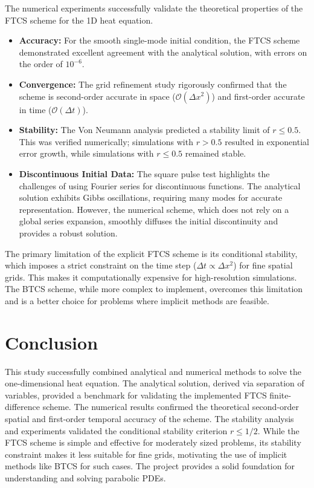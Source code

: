 \documentclass[11pt, a4paper]{article}
\begin{document}
The numerical experiments successfully validate the theoretical properties of the FTCS scheme for the 1D heat equation.
\begin{itemize}
    \item \textbf{Accuracy:} For the smooth single-mode initial condition, the FTCS scheme demonstrated excellent agreement with the analytical solution, with errors on the order of $10^{-6}$.
    \item \textbf{Convergence:} The grid refinement study rigorously confirmed that the scheme is second-order accurate in space ($\mathcal{O}(\Delta x^2)$) and first-order accurate in time ($\mathcal{O}(\Delta t)$).
    \item \textbf{Stability:} The Von Neumann analysis predicted a stability limit of $r \leq 0.5$. This was verified numerically; simulations with $r > 0.5$ resulted in exponential error growth, while simulations with $r \leq 0.5$ remained stable.
    \item \textbf{Discontinuous Initial Data:} The square pulse test highlights the challenges of using Fourier series for discontinuous functions. The analytical solution exhibits Gibbs oscillations, requiring many modes for accurate representation. However, the numerical scheme, which does not rely on a global series expansion, smoothly diffuses the initial discontinuity and provides a robust solution.
\end{itemize}

The primary limitation of the explicit FTCS scheme is its conditional stability, which imposes a strict constraint on the time step ($\Delta t \propto \Delta x^2$) for fine spatial grids. This makes it computationally expensive for high-resolution simulations. The BTCS scheme, while more complex to implement, overcomes this limitation and is a better choice for problems where implicit methods are feasible.

\section{Conclusion}

This study successfully combined analytical and numerical methods to solve the one-dimensional heat equation. The analytical solution, derived via separation of variables, provided a benchmark for validating the implemented FTCS finite-difference scheme. The numerical results confirmed the theoretical second-order spatial and first-order temporal accuracy of the scheme. The stability analysis and experiments validated the conditional stability criterion $r \leq 1/2$. While the FTCS scheme is simple and effective for moderately sized problems, its stability constraint makes it less suitable for fine grids, motivating the use of implicit methods like BTCS for such cases. The project provides a solid foundation for understanding and solving parabolic PDEs.
\end{document}
